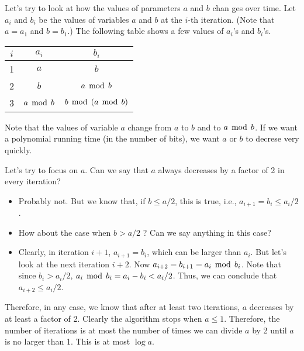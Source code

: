 \begin{frame}

  Let's try to look at how the values of parameters $a$ and $b$ chan
  ges over time.  Let $a_i$ and $b_i$ be the values of variables $a$
  and $b$ at the $i$-th iteration.  (Note that $a=a_1$ and $b=b_1$.)
  The following table shows a few values of $a_i$'s and $b_i$'s. 
  
  \vspace{0.2in}
  \begin{tabular}{c|c|c}
    $i$ & $a_i$ & $b_i$\\ \hline
    1 & $a$ & $b$ \\
    2 & $b$ & $a\,\bmod\, b$ \\
    3 & $a\,\bmod\, b$ & $b\,\bmod\, (a\,\bmod\, b)$ \\
  \end{tabular}
  \vspace{0.2in}
  
  Note that the values of variable $a$ change from $a$ to $b$ and to
  $a\,\bmod\, b$.  If we want a polynomial running time (in the number of
  bits), we want $a$ or $b$ to decrese very quickly.
\end{frame}

\begin{frame}
  Let's try to focus on $a$.  Can we say that $a$ always decreases by
  a factor of 2 in every iteration?
    
  \begin{itemize}
  \item Probably not.  But we know that, if $b\leq a/2$, this is true,
    i.e., $a_{i+1}=b_i\leq a_i/2$. 
  \item How about the case when $b>a/2$ ? Can we say anything in this
    case? \pause
  \item Clearly, in iteration $i+1$, $a_{i+1}=b_i$, which can be
    larger than $a_i$.  But let's look at the next iteration $i+2$.
    Now $a_{i+2}=b_{i+1}=a_i\,\bmod\, b_i$.  Note that since $b_i>a_i/2$,
    $a_i\,\bmod\, b_i = a_i - b_i < a_i/2$.  Thus, we can conclude that
    $a_{i+2}\leq a_i/2$.
  \end{itemize}

  Therefore, in any case, we know that after at least two iterations,
  $a$ decreases by at least a factor of 2.  Clearly the algorithm
  stops when $a\leq 1$.  Therefore, the number of iterations is at
  most the number of times we can divide $a$ by 2 until $a$ is no
  larger than 1.  This is at most $\log a$.
\end{frame}

